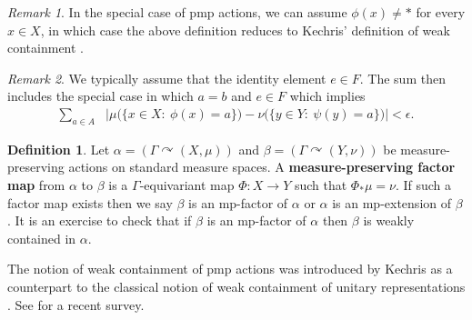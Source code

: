 \documentclass[12pt]{article}
\theoremstyle{plain}
\newtheorem{lem}[thm]{Lemma}
\theoremstyle{definition}
\newtheorem{defn}{Definition}
\theoremstyle{remark}
\newtheorem{remark}{Remark}
\newcommand{\G}{\Gamma}
\newcommand{\eps}{\epsilon}
\renewcommand\a{\alpha}
\renewcommand\b{\beta}
\def\cc{{\curvearrowright}}
\begin{document}
\begin{remark}
    In the special case of pmp actions, we can assume $\phi(x) \ne *$ for every $x\in X$, in which case the above definition reduces to Kechris' definition of weak containment \cite{kechris-2012}.
\end{remark}

\begin{remark}
   We typically assume that the identity element $e\in F$. The sum then includes the special case in which $a=b$ and $e\in F$ which implies
   \begin{align*}
    \sum_{a\in A} & \Big|\mu\big(\{x\in X:~ \phi(x)=a \}\big)- \nu\big(\{y\in Y:~ \psi(y)=a\}\big)\Big|<\eps.
\end{align*}
\end{remark}

\begin{defn}
    Let $\a=(\G\cc (X,\mu))$ and $\b=(\G\cc (Y,\nu))$ be measure-preserving actions on standard measure spaces. A {\bf measure-preserving factor map} from $\a$ to $\b$ is a $\G$-equivariant map $\Phi:X\to Y$ such that $\Phi_*\mu=\nu$. If such a factor map exists then we say $\b$ is an mp-factor of $\a$ or $\a$ is an mp-extension of $\b$. It is an exercise to check that if $\b$ is an mp-factor of $\a$ then $\b$ is weakly contained in $\a$.
\end{defn}









The notion of weak containment of pmp actions was introduced by Kechris as a counterpart to the classical notion of weak containment of unitary representations \cite{MR2931406}. See \cite{MR4138908} for a recent survey. 
\end{document}
